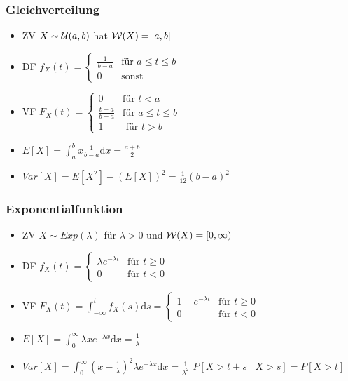 \subsubsection{Gleichverteilung}
\begin{itemize}
    \item ZV $X \sim \mathcal{U}(a,b)$ hat $\mathcal{W}(X) = [a,b]$
    \item DF $f_X(t) =
\begin{cases}
    \frac{1}{b - a} &\text{für } a \le t \le b\\
    0 & \text{sonst}
\end{cases}$
    \item VF $F_X(t) =
\begin{cases}
    0 &\text{für } t < a\\
    \frac{t - a}{b - a} &\text{für } a \le t \le b\\
    1 &\text{ für } t > b
\end{cases}$
    \item $E[X] = \int_{a}^{b} x \frac{1}{b - a} \mathrm{d}x = \frac{a + b}{2}$
    \item $Var[X] = E[X^2] - (E[X])^2 = \frac{1}{12}(b - a)^2$
\end{itemize}

\subsubsection{Exponentialfunktion}
\begin{itemize}
    \item ZV $X \sim Exp(\lambda)$ für $\lambda > 0$ und $\mathcal{W}(X) = [0, \infty)$
    \item DF $f_X(t) =
\begin{cases}
    \lambda e ^{-\lambda t} &\text{für } t \ge 0\\
    0 & \text{für } t < 0
\end{cases}$
    \item VF $F_X(t) = \int_{-\infty}^{t} f_X(s) \mathrm{d}s =
\begin{cases}
    1 - e^{- \lambda t} &\text{für } t \ge 0\\
    0 &\text{für } t < 0
\end{cases}$
    \item $E[X] = \int_{0}^{\infty} \lambda x e^{-\lambda x} \mathrm{d}x = \frac{1}{\lambda}$
    \item $Var[X] = \int_{0}^{\infty} (x - \frac{1}{\lambda})^2 \lambda e^{-\lambda x} \mathrm{d}x = \frac{1}{\lambda^2}$
     $P[X > t + s \mid X > s] = P[X > t]$
\end{itemize}

